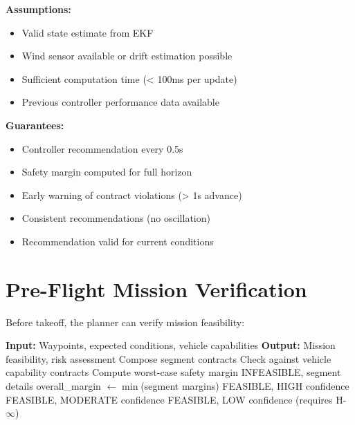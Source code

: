 \begin{contractbox}
\textbf{Assumptions:}
\begin{itemize}
    \item Valid state estimate from EKF
    \item Wind sensor available or drift estimation possible
    \item Sufficient computation time (< 100ms per update)
    \item Previous controller performance data available
\end{itemize}

\textbf{Guarantees:}
\begin{itemize}
    \item Controller recommendation every 0.5s
    \item Safety margin computed for full horizon
    \item Early warning of contract violations (> 1s advance)
    \item Consistent recommendations (no oscillation)
    \item Recommendation valid for current conditions
\end{itemize}
\end{contractbox}

\section{Pre-Flight Mission Verification}

Before takeoff, the planner can verify mission feasibility:

\begin{algorithm}[H]
\caption{Pre-Flight Mission Verification}
\begin{algorithmic}[1]
    \State \textbf{Input:} Waypoints, expected conditions, vehicle capabilities
    \State \textbf{Output:} Mission feasibility, risk assessment
    \State
        \State Compose segment contracts
        \State Check against vehicle capability contracts
        \State Compute worst-case safety margin
            \State \Return INFEASIBLE, segment details
        \EndIf
    \EndFor
    \State
    \State overall\_margin $\gets \min$(segment margins)
        \State \Return FEASIBLE, HIGH confidence
        \State \Return FEASIBLE, MODERATE confidence
    \Else
        \State \Return FEASIBLE, LOW confidence (requires H-$\infty$)
    \EndIf
\end{algorithmic}
\end{algorithm}

